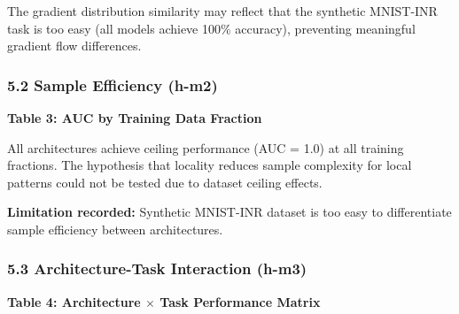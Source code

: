 The gradient distribution similarity may reflect that the synthetic MNIST-INR task is too easy (all models achieve 100\% accuracy), preventing meaningful gradient flow differences.

\subsubsection{5.2 Sample Efficiency (h-m2)}

\textbf{Table 3: AUC by Training Data Fraction}

\begin{table}[htbp]
\centering
{}
\end{table}

All architectures achieve ceiling performance (AUC = 1.0) at all training fractions. The hypothesis that locality reduces sample complexity for local patterns could not be tested due to dataset ceiling effects.

\textbf{Limitation recorded:} Synthetic MNIST-INR dataset is too easy to differentiate sample efficiency between architectures.

\subsubsection{5.3 Architecture-Task Interaction (h-m3)}

\textbf{Table 4: Architecture $\times$ Task Performance Matrix}

\begin{table}[htbp]
\centering
{}
\end{table}

